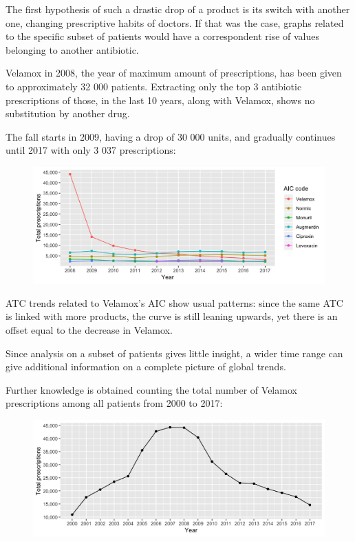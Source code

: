 The first hypothesis of such a drastic drop of a product is its switch with another one, changing prescriptive habits of doctors. If that was the case, graphs related to the specific subset of patients would have a correspondent rise of values belonging to another antibiotic.

Velamox in 2008, the year of maximum amount of prescriptions, has been given to approximately 32 000 patients. Extracting only the top 3 antibiotic prescriptions of those, in the last 10 years, along with Velamox, shows no substitution by another drug.

The fall starts in 2009, having a drop of 30 000 units, and gradually continues until 2017 with only 3 037 prescriptions:

\begin{figure}[h]
	\centering
	\includegraphics[scale=0.3]{../plots/top_aic_subset-year.png}
\end{figure}

ATC trends related to Velamox's AIC show usual patterns: since the same ATC is linked with more products, the curve is still leaning upwards, yet there is an offset equal to the decrease in Velamox.

Since analysis on a subset of patients gives little insight, a wider time range can give additional information on a complete picture of global trends. 

Further knowledge is obtained counting the total number of Velamox prescriptions among all patients from 2000 to 2017:

\begin{figure}[h]
	\centering
	\includegraphics[scale=0.3]{../plots/velamox-year.png}
\end{figure}

